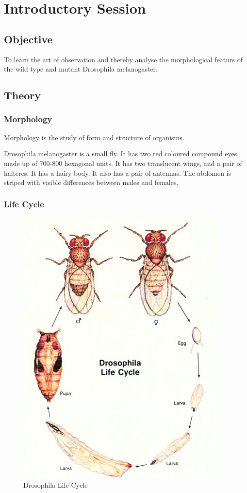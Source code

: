 \chapter{Introductory Session}\label{ch:introduction}
\section{Objective}
To learn the art of observation and thereby analyse the morphological featurs of the wild type and mutant Drosophila melanogaster.

\section{Theory}
	\subsection{Morphology}
		Morphology is the study of form and structure of organisms.
		\par	
		Drosophila melanogaster is a small fly. It has two red coloured compound eyes, made up of 700-800 hexagonal units. It has two translucent wings, and a pair of halteres. It has a hairy body. It also has a pair of antennas. The abdomen is striped with visible differences between males and females.
	\subsection{Life Cycle}
		\begin{figure}[h]
			\begin{center}
				\includegraphics[width=.5\linewidth]{gfx/drosophila}
			\end{center}
		\caption[Drosophila Life Cycle]{Drosophila Life Cycle \citep{drosophila:lifecycle}}
		\end{figure}

